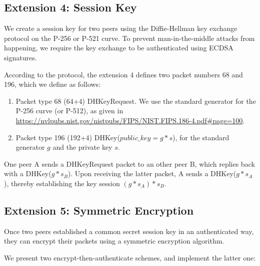 \documentclass[12pt,a4paper]{article}
\begin{document}
\subsection{Extension 4: Session Key}
We create a session key for two peers using the Diffie-Hellman key exchange protocol on the P-256 or P-521 curve. To prevent man-in-the-middle attacks from happening, we require the key exchange to be authenticated using ECDSA signatures.

According to the protocol, the extension 4 defines two packet numbers 68 and 196, which we define as follows:

\begin{enumerate}
\item Packet type 68 (64+4) DHKeyRequest. We use the standard generator for the P-256 curve (or P-512), as given in \url{https://nvlpubs.nist.gov/nistpubs/FIPS/NIST.FIPS.186-4.pdf#page=100}.
  \item Packet type 196 (192+4) DHKey($public\_key=g * s$), for the standard generator $g$ and the private key $s$.
  \end{enumerate}

 One peer A sends a DHKeyRequest packet to an other peer B, which replies back with a DHKey($g * s_B$). Upon receiving the latter packet, A sends a DHKey($g * s_A$), thereby establishing the key session $(g * s_A) * s_B$.


 \subsection{Extension 5: Symmetric Encryption}
 Once two peers established a common secret session key in an authenticated way, they can encrypt their packets using a symmetric encryption algorithm.

 We present two encrypt-then-authenticate schemes, and implement the latter one:
\end{document}
